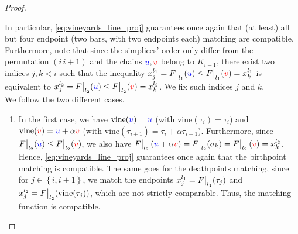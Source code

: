 \documentclass{article}
\newcommand{\vine}{\mathrm{vine}}
\newcommand\restr[2]{{  \left.\kern-\nulldelimiterspace #1 \vphantom{\big|} \right|_{#2}  }}
\begin{document}
\begin{proof}
\begin{enumerate}
\begin{enumerate}
					In particular, \cref{eq:vineyards_line_proj} guarantees once
					again that (at least) all but four  endpoint (two bars, with two endpoints each) matching are compatible.
					Furthermore, note that since the simplices' order only differ from the
					permutation $(i\, i+1)$ and the chains ${\color{blue} u},{\color{red} v}$ belong to $ K_{i-1}$, there exist two indices $j,k < i $ such that the inequality $x_j^{l_1} = \restr F {l_1}(\u)
					\le \restr F {l_1}(\v) = x_k^{l_1}$ is equivalent to $x_j^{l_2}=\restr F {l_2}(\u)
					\le \restr F {l_2}(\v) = x_k^{l_2}$.
					We fix such indices $j$ and $k$.
					\\
					We follow the two different cases.
					\begin{enumerate}
						\item {}\label{vine:negok}
							In the first case, we have  $\vine(\u) = \u$ (with
							$\vine(\tau_i) = \tau_i$)
							and
							$\vine(\v) =\u+\alpha\v$
							(with $\vine(\tau _{i+1}) = \tau _{i} + \alpha \tau _{i+1}$).
							Furthermore,  since $\restr F {l_2}(\u)
							\le \restr F {l_2}(\v)$, we also have $\restr F
							{l_2} \left( \u+ \alpha\v \right)
							= \restr F {l_2} (\sigma_k)
							=\restr F
							{l_2} \left(\v \right) =  x_{k}^{l_2}$.
							Hence, \cref{eq:vineyards_line_proj} guarantees once again that the birthpoint matching is compatible.
							The same goes for the deathpoints matching, since for $j\in \left\{ i,i+1 \right\}$, we match the endpoints
							$x_{j}^{l_1} = \restr F {l_1}(\tau_j)$ and
							$x_{j}^{l_2} = \restr F {l_2}(\vine(\tau_j))$,
							which are not strictly comparable.
							Thus, the matching function is compatible.


\end{enumerate}
\end{enumerate}
\end{enumerate}
\end{proof}
\end{document}
